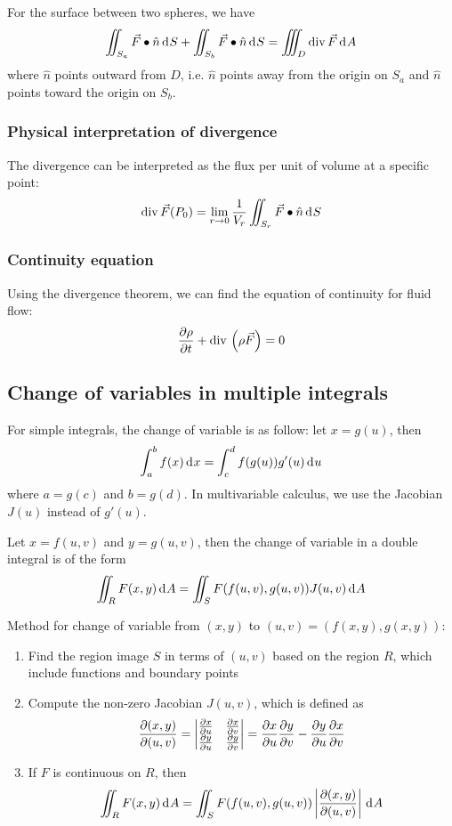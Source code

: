 \documentclass[10pt, twocolumn]{article}
\theoremstyle{remark}
\begin{document}
For the surface between two spheres, we have
\[
  \iint_{S_a}{\vec{F} \bullet \hat{n} \,\mathrm{d}^{} S} + \iint_{S_b}{\vec{F} \bullet \hat{n} \,\mathrm{d}^{} S} = \iiint_D {\mathrm{div}\,\vec{F} \,\mathrm{d}^{} A}
\]
where \(\hat{n}\) points outward from \(D\), i.e. \(\hat{n}\) points away from the origin on \(S_a\) and \(\hat{n}\) points toward the origin on \(S_b\).

\subsubsection*{Physical interpretation of divergence}
The divergence can be interpreted as the flux per unit of volume at a specific point:
\[
  \mathrm{div}\,\vec{F}(P_0) = \lim_{r \to 0}{\frac{1}{V_r}\iint_{S_r}{\vec{F} \bullet \hat{n} \,\mathrm{d}^{} S}}
\]

\subsubsection*{Continuity equation}
Using the divergence theorem, we can find the equation of continuity for fluid flow:
\[
  \frac{\partial \rho}{\partial t} + \mathrm{div\,}\left( \rho\vec{F} \right) = 0
\]


\subsection{Change of variables in multiple integrals}
For simple integrals, the change of variable is as follow: let \(x = g(u)\), then
\[
  \int_a ^b {f(x) \,\mathrm{d}^{} x} = \int_c ^d {f(g(u)) g'(u) \,\mathrm{d}^{} u}
\]
where \(a = g(c)\) and \(b = g(d)\).
In multivariable calculus, we use the Jacobian \(J(u)\) instead of \(g'(u)\).

Let \(x = f(u, v)\) and \(y = g(u, v)\), then the change of variable in a double integral is of the form
\[
  \iint_R {F(x, y) \,\mathrm{d}^{} A} = \iint_S {F(f(u, v), g(u, v)) J(u, v) \,\mathrm{d}^{} A}
\]

Method for change of variable from \((x, y)\) to \((u, v) = (f(x, y),g(x, y))\):
\begin{enumerate}
  \item Find the region image \(S\) in terms of \((u, v)\) based on the region \(R\), which include functions and boundary points
  \item Compute the non-zero Jacobian \(J(u, v)\), which is defined as
        \[
          \frac{\partial (x, y)}{\partial (u, v)} =
          \begin{vmatrix}
            \frac{\partial x}{\partial u} & \frac{\partial x}{\partial v} \\
            \frac{\partial y}{\partial u} & \frac{\partial y}{\partial v}
          \end{vmatrix}
          = \frac{\partial x}{\partial u} \frac{\partial y}{\partial v}  - \frac{\partial y}{\partial u} \frac{\partial x}{\partial v}
        \]
  \item If \(F\) is continuous on \(R\), then
        \[
          \iint_R {F(x, y) \,\mathrm{d}^{} A} = \iint_S {F(f(u, v), g(u, v)) \left| \frac{\partial (x, y)}{\partial (u, v)} \right| \,\mathrm{d}^{} A}
        \]
\end{enumerate}
\end{document}

